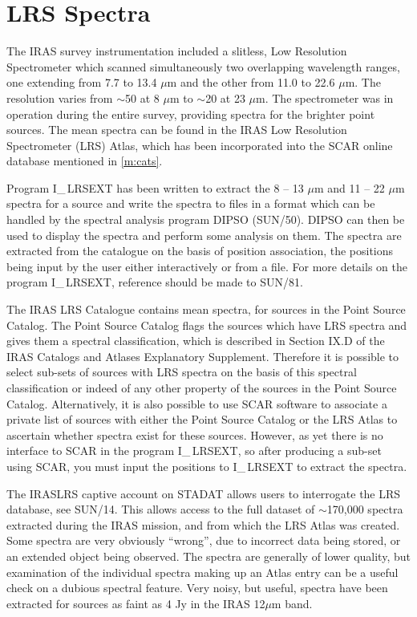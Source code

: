 \section{LRS Spectra} 
The IRAS survey instrumentation included a slitless, Low Resolution 
Spectrometer which scanned simultaneously two overlapping wavelength ranges, 
one extending from 7.7 to 13.4 $\mu$m and the other from 11.0 to 22.6 $\mu$m.
The resolution varies from $\sim$50 at 8 $\mu$m to $\sim$20 at 23 $\mu$m.
The spectrometer was in operation during the entire survey, providing spectra
for the brighter point sources.
The mean spectra can be found in the IRAS Low Resolution Spectrometer (LRS)
Atlas, which has been incorporated into the SCAR online database mentioned
in \ref{m:cats}.

Program I\_$\,$LRSEXT has been written to extract the 8 -- 13 $\mu$m and 
11 -- 22 $\mu$m spectra for a source and write the spectra to files in a 
format which can be handled by the spectral analysis program DIPSO (SUN/50).
DIPSO can then be used to display the spectra and perform some analysis on them.
The spectra are extracted from the catalogue on the basis of position
association, the positions being input by the user either interactively or from
a file.
For more details on the program I\_$\,$LRSEXT, reference should be made to 
SUN/81.

The IRAS LRS Catalogue contains mean spectra, for sources in the Point 
Source Catalog.
The Point Source Catalog flags the sources which have LRS spectra and gives
them a spectral classification, which is described in Section IX.D of the IRAS 
Catalogs and Atlases Explanatory Supplement.
Therefore it is possible to select sub-sets of sources with LRS spectra on the
basis of this spectral classification or indeed of any other property of the
sources in the Point Source Catalog.
Alternatively, it is also possible to use SCAR software to associate a private
list of sources with either the Point Source Catalog or the LRS Atlas to
ascertain whether spectra exist for these sources.
However, as yet there is no interface to SCAR in the program I\_$\,$LRSEXT, so 
after producing a sub-set using SCAR, you must input the positions to 
I\_$\,$LRSEXT to extract the spectra.

The IRASLRS captive account on STADAT allows users to interrogate the LRS 
database, see SUN/14.
This allows access to the full dataset of $\sim$170,000 spectra extracted 
during the IRAS mission, and from which the LRS Atlas was created.
Some spectra are very obviously ``wrong'', due to incorrect data being stored,
or an extended object being observed.
The spectra are generally of lower quality, but examination of the individual
spectra making up an Atlas entry can be a useful check on a dubious spectral
feature.
Very noisy, but useful, spectra have been extracted for sources as faint as
4 Jy in the IRAS 12$\mu$m band.

